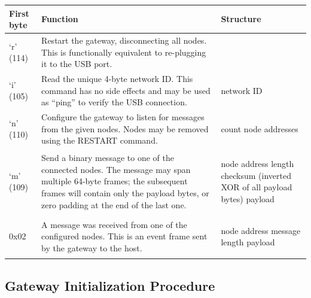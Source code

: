 {	
\tabulinesep=5pt
\begin{longtabu} to 	
	\toprule
	\textbf{First byte} & \textbf{Function} & \textbf{Structure} \\
	\midrule
	\endhead
	
	\bottomrule	
	\endfoot
	
	`r' (114) & 
	Restart the gateway, disconnecting all nodes. This is functionally equivalent to re-plugging it to the USB port.
	& \\
	
	`i' (105) &
	Read the unique 4-byte network ID. This command has no side effects and may be used as ``ping'' to verify the USB connection. & 	
	\begin{cmdresp}
		 network ID
	\end{cmdresp} 
	\\
	
	`n' (110) &
	Configure the gateway to listen for messages from the given nodes.
	Nodes may be removed using the RESTART command.
	& 
	\begin{cmdreq}		
		 count
		 node addresses
	\end{cmdreq}
	\\
	
	`m' (109)&	
	Send a binary message to one of the connected nodes. The message may span multiple 64-byte frames; the subsequent frames will contain only the payload bytes, or zero padding at the end of the last one.
	& \begin{cmdreq}
		 node address
		 length
		 checksum (inverted XOR of all payload bytes)
		 payload
	\end{cmdreq} \\

	0x02 & 
	A message was received from one of the configured nodes. This is an event frame sent by the gateway to the host.
	& \begin{cmdpld}		
		 node address
		 message length
		 payload
	\end{cmdpld} \\

\end{longtabu}
}

\subsection{Gateway Initialization Procedure}

